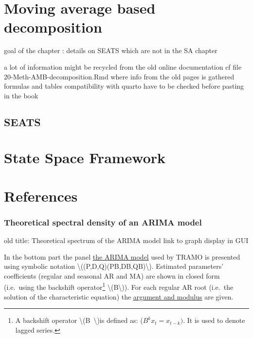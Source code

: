 \documentclass[
  letterpaper,
  DIV=11,
  numbers=noendperiod]{scrreprt}
\newlength{\cslhangindent}
\newlength{\cslentryspacingunit} %
\newenvironment{CSLReferences}[2] %
 {%
  \setlength{\parindent}{0pt}
  \ifodd #1
  \let\oldpar\par
  \def\par{\hangindent=\cslhangindent\oldpar}
  \fi
  \setlength{\parskip}{#2\cslentryspacingunit}
 }%
 {}
\begin{document}
\hypertarget{moving-average-based-decomposition-1}{%
\chapter{Moving average based
decomposition}\label{moving-average-based-decomposition-1}}

goal of the chapter : details on SEATS which are not in the SA chapter

a lot of information might be recycled from the old online documentation
cf file 20-Meth-AMB-decomposition.Rmd where info from the old pages is
gathered formulas and tables compatibility with quarto have to be
checked before pasting in the book

\hypertarget{seats}{%
\section{SEATS}\label{seats}}

\hypertarget{state-space-framework-1}{%
\chapter{State Space Framework}\label{state-space-framework-1}}

\hypertarget{references-1}{%
\chapter*{References}\label{references-1}}

\hypertarget{refs}{}
\begin{CSLReferences}{0}{0}
\end{CSLReferences}

\hypertarget{theoretical-spectral-density-of-an-arima-model-1}{%
\subsection{Theoretical spectral density of an ARIMA
model}\label{theoretical-spectral-density-of-an-arima-model-1}}

old title: Theoretical spectrum of the ARIMA model link to graph display
in GUI

In the bottom part the panel \href{../theory/SA_lin.html}{the ARIMA
model} used by TRAMO is presented using symbolic notation
\textbackslash((P,D,Q)(PB,DB,QB)\textbackslash). Estimated parameters'
coefficients (regular and seasonal AR and MA) are shown in closed form
(i.e.~using the backshift operator\footnote{A backshift operator
  \textbackslash(B~\textbackslash)is defined as:
  (\(B^{k}x_{t} = x_{t - k})\). It is used to denote lagged series.}
\textbackslash(B\textbackslash)). For each regular AR root (i.e.~the
solution of the characteristic equation) the
\protect\hyperlink{derivation-of-the-models-for-the-components}{argument
and modulus} are given.
\end{document}
